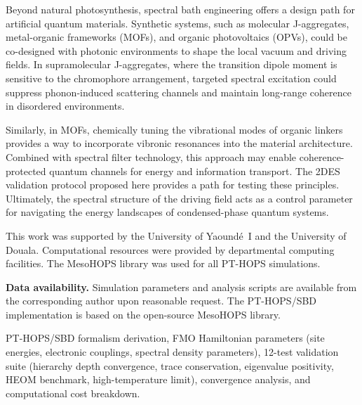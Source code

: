 \documentclass[journal=jpcl,manuscript=letter]{achemso}
\begin{document}
Beyond natural photosynthesis, spectral bath engineering offers a design path for artificial quantum materials. Synthetic systems, such as molecular J-aggregates, metal-organic frameworks (MOFs), and organic photovoltaics (OPVs), could be co-designed with photonic environments to shape the local vacuum and driving fields. In supramolecular J-aggregates, where the transition dipole moment is sensitive to the chromophore arrangement, targeted spectral excitation could suppress phonon-induced scattering channels and maintain long-range coherence in disordered environments.

Similarly, in MOFs, chemically tuning the vibrational modes of organic linkers provides a way to incorporate vibronic resonances into the material architecture. Combined with spectral filter technology, this approach may enable coherence-protected quantum channels for energy and information transport. The 2DES validation protocol proposed here provides a path for testing these principles. Ultimately, the spectral structure of the driving field acts as a control parameter for navigating the energy landscapes of condensed-phase quantum systems.


\begin{acknowledgement}
This work was supported by the University of Yaoundé~I and the University of Douala. Computational resources were provided by departmental computing facilities. The MesoHOPS library was used for all PT-HOPS simulations.
\end{acknowledgement}


\textbf{Data availability.} Simulation parameters and analysis scripts are available from the corresponding author upon reasonable request. The PT-HOPS/SBD
implementation is based on the open-source MesoHOPS library.


\begin{suppinfo}
PT-HOPS/SBD formalism derivation, FMO Hamiltonian parameters (site energies, electronic couplings, spectral density parameters), 12-test validation suite (hierarchy depth convergence, trace conservation, eigenvalue positivity, HEOM benchmark, high-temperature limit), convergence analysis, and computational cost breakdown.
\end{suppinfo}



\end{document}
